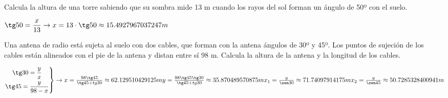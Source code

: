 \documentclass[addpoints,spanish, 12pt,a4paper]{exam}
\begin{document}
\begin{questions}
\addpoints

\question[1]  Calcula la altura de una torre sabiendo que su sombra mide 13 m cuando los rayos del
sol forman un ángulo de 50º con el suelo.
\begin{solution} $\tg 50 = \dfrac{x}{13} \to x=13\cdot\tg 50\approx15.4927967037247m$ \end{solution}

\question[2]   Una antena de radio está sujeta al suelo con dos cables, que forman con la antena ángulos de 30º y 45º. Los puntos de sujeción de los cables están alineados  con el pie de la antena  y distan entre sí 98 m.
Calcula la altura de la antena y la longitud de los cables.
\begin{solution} $\left. \begin{gathered}
	  \tg 30 = \frac{y}{x} \\
	  \tg 45 = \frac{y}{98-x} \hfill
	 \end{gathered}  \right\rbrace \to \\
	 x=\frac{98\tg45}{\tg45+tg30}\approx62.129510429125 m\\
	 y=\frac{98\tg45\tg30}{\tg45+tg30}\approx35.870489570875 m\\
	 x_1=\frac{y}{\sen30}\approx71.74097914175 m \\
	 x_2=\frac{y}{\sen45}\approx50.7285328400941m$\end{solution}


\end{questions}
\end{document}
